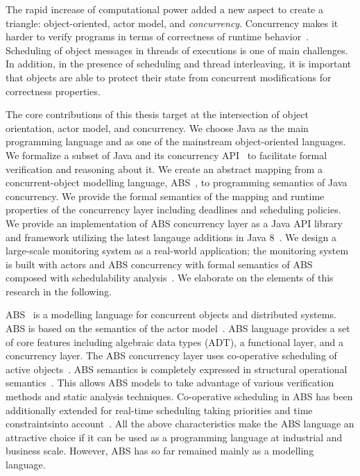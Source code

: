 The rapid increase of computational power added a new aspect to create a triangle: object-oriented, actor model, and \emph{concurrency}.
Concurrency makes it harder to verify programs in terms of correctness of runtime behavior~\cite{Herlihy:1990:linear,johnsen:history,agha:predictive:safety}. 
Scheduling of object messages in threads of executions is one of main challenges.
In addition, in the presence of scheduling and thread interleaving, it is important that objects are able to protect their state from concurrent modifications for correctness properties.

The core contributions of this thesis target at the intersection of object 
orientation, actor model, and concurrency.
We choose Java as the main programming language and as one of the mainstream 
object-oriented languages. 
We formalize a subset of Java and its concurrency API~\cite{jsr166} to 
facilitate formal verification and reasoning about it.
We create an abstract mapping from a concurrent-object modelling language, 
ABS~\cite{johnsen2012abs}, to programming semantics of Java concurrency. 
We provide the formal semantics of the mapping and runtime properties of 
the concurrency layer including deadlines and scheduling policies.
We provide an implementation of ABS concurrency layer as a Java API library 
and framework utilizing the latest langauge additions 
in Java 8~\cite{jsr335:lambda:translation}.
We design a large-scale monitoring system as a real-world application; 
the monitoring system is built with actors and ABS concurrency 
with formal semantics of ABS composed with 
schedulability analysis~\cite{fersman2007task}.
We elaborate on the elements of this research in the following.

ABS~\cite{johnsen2012abs,hahnlehjlssw11} is a modelling language for concurrent objects and distributed systems.
ABS is based on the semantics of the actor model~\cite{actors:agha}.
ABS language provides a set of core features including algebraic data types (ADT), a functional layer, and a concurrency layer.
The ABS concurrency layer uses co-operative scheduling of active objects~\cite{creol:broch:owe}.
ABS semantics is completely expressed in structural operational semantics~\cite{plotkin:sos}.
This allows ABS models to take advantage of various verification methods and static analysis techniques.
% 
Co-operative scheduling in ABS has been additionally extended for real-time scheduling taking priorities and time constraintsinto account~\cite{bjork2013:rtabs,johnsen2012modeling}.
All the above characteristics make the ABS language an attractive choice if it
can be used as a programming language at industrial and business scale.
However, ABS has so far remained mainly as a modelling language.

